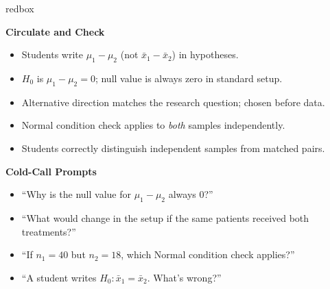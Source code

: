 \documentclass[10pt]{article}
\begin{document}
\begin{skillbox}{redbox}
\begin{minipage}[t]{0.48\linewidth}
    \textbf{Circulate and Check}
    \begin{itemize}
        \item Students write $\mu_1 - \mu_2$ (not $\bar x_1 - \bar x_2$) in hypotheses.
        \item $H_0$ is $\mu_1 - \mu_2 = 0$; null value is always zero in standard setup.
        \item Alternative direction matches the research question; chosen before data.
        \item Normal condition check applies to \emph{both} samples independently.
        \item Students correctly distinguish independent samples from matched pairs.
    \end{itemize}
\end{minipage}
\hfill
\begin{minipage}[t]{0.48\linewidth}
    \textbf{Cold-Call Prompts}
    \begin{itemize}
        \item ``Why is the null value for $\mu_1 - \mu_2$ always 0?''
        \item ``What would change in the setup if the same patients received
              both treatments?''
        \item ``If $n_1 = 40$ but $n_2 = 18$, which Normal condition check applies?''
        \item ``A student writes $H_0: \bar x_1 = \bar x_2$. What's wrong?''
    \end{itemize}
\end{minipage}
\end{skillbox}
\end{document}
